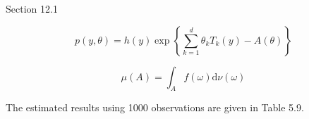 \documentclass{homework}
\begin{document}
\maketitle




\begin{chapter}{Section 12.1}

\begin{problem}%

\lipsum[1] %

\[p\left( y,\theta \right) =h\left( y\right) \exp \left\{ \sum_{k=1}^{d}\theta
_{k}T_{k}\left( y\right) -A\left( \theta \right) \right\}\]

\begin{probpart}
 \lipsum[2] %

\answer{ 
} \end{probpart}

\[\mu(A)=\int_A f(\omega) \text{d} \nu(\omega)\]

\begin{probpart}
\lipsum[3] %

\answer{ 
} \end{probpart}

\begin{probpart}
\lipsum[9]

\answer{ 
} \end{probpart}

\begin{probpart}
The estimated results using 1000 observations are given in Table 5.9.

\answer{ 
\lipsum[10]
} \end{probpart}

\end{problem}


\end{chapter}
\end{document}
